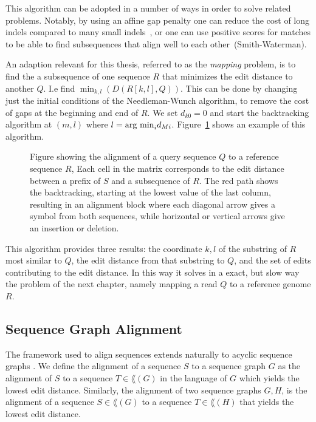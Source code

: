 This algorithm can be adopted in a number of ways in order to solve related problems.
Notably, by using an affine gap penalty one can reduce the cost of long indels compared to many small indels~\cite{affine}, or one can use positive scores for matches to be able to find subsequences that align well to each other~\cite{smithwaterman}(Smith-Waterman).

An adaption relevant for this thesis, referred to as the \emph{mapping} problem, is to find the a subsequence of one sequence $R$ that minimizes the edit distance to another $Q$.
I.e find $\min_{k, l}(D(R[k, l], Q))$.
This can be done by changing just the initial conditions of the Needleman-Wunch algorithm, to remove the cost of gaps at the beginning and end of $R$.
We set $d_{k0} = 0$ and start the backtracking algorithm at $(m, l)$ where $l=\argmin_i d_{Mi}$.
Figure~\ref{fig:needlemanmap} shows an example of this algorithm.
\begin{figure}
  \begin{tikzpicture}
    
  \end{tikzpicture}
  \caption{
    Figure showing the alignment of a query sequence $Q$ to a reference sequence $R$, 
    Each cell in the matrix corresponds to the edit distance between a prefix of $S$ and a subsequence of $R$. The red path shows the backtracking, starting at the lowest value of the last column, resulting in an alignment block where each diagonal arrow gives a symbol from both sequences, while horizontal or vertical arrows give an insertion or deletion.}
  \label{fig:needlemanmap}
\end{figure}
This algorithm provides three results: the coordinate $k, l$ of the substring of $R$ most similar to $Q$, the edit distance from that substring to $Q$, and the set of edits contributing to the edit distance.
In this way it solves in a exact, but slow way the problem of the next chapter, namely mapping a read $Q$ to a reference genome $R$.

\subsection{Sequence Graph Alignment}
The framework used to align sequences extends naturally to acyclic sequence graphs \cite{hein, poa}.
We define the alignment of a sequence $S$ to a sequence graph $G$ as the alignment of $S$ to a sequence $T \in \lang(G)$ in the language of $G$ which yields the lowest edit distance.
Similarly, the alignment of two sequence graphs $G, H$, is the alignment of a sequence $S \in \lang(G)$ to a sequence $T \in \lang(H)$ that yields the lowest edit distance. 

